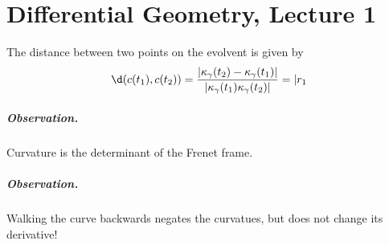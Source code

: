 \chapter{Differential Geometry, Lecture 1}

\begin{lemma}\label{DotProductDifferentiation}

\end{lemma}

\begin{lemma}\label{EvolventDistanceFormula}
    The distance between two points on the evolvent is given by
    \[
        \d (c(t_1), c(t_2) ) = \frac{ \lvert \kappa_\gamma(t_2) - \kappa_\gamma(t_1) \rvert}{\lvert \kappa_\gamma(t_1) \kappa_\gamma(t_2) \rvert } = \lvert r_1
    \]
\end{lemma}

\paragraph{Observation.} Curvature is the determinant of the Frenet frame.
\paragraph{Observation.} Walking the curve backwards negates the curvatues, but does not change its derivative!

